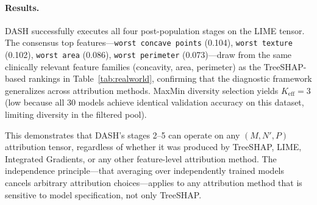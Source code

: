 \documentclass[11pt]{article}
\newcommand{\dash}{\textsc{DASH}}
\begin{document}
\paragraph{Results.}
\dash{} successfully executes all four post-population stages on the
LIME tensor. The consensus top features---\texttt{worst concave points}
(0.104), \texttt{worst texture} (0.102), \texttt{worst area} (0.086),
\texttt{worst perimeter} (0.073)---draw from the same clinically
relevant feature families (concavity, area, perimeter) as the
TreeSHAP-based rankings in Table~\ref{tab:realworld}, confirming that
the diagnostic framework generalizes across attribution methods.
MaxMin diversity selection yields $K_{\text{eff}} = 3$ (low because all
30 models achieve identical validation accuracy on this dataset,
limiting diversity in the filtered pool).

This demonstrates that \dash{}'s stages 2--5 can operate on any
$(M, N', P)$ attribution tensor, regardless of whether it was produced
by TreeSHAP, LIME, Integrated Gradients, or any other feature-level
attribution method. The independence principle---that averaging over
independently trained models cancels arbitrary attribution
choices---applies to any attribution method that is sensitive to model
specification, not only TreeSHAP.
\end{document}
